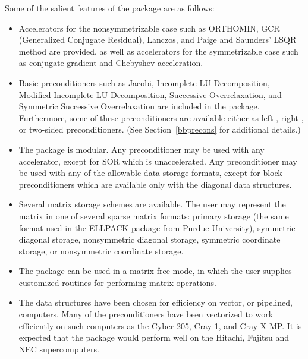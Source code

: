    Some of the salient features of the package are as follows:
\begin{itemize}
\item
 Accelerators for the nonsymmetrizable case such as ORTHOMIN, 
 GCR (Generalized Conjugate Residual), Lanczos, and Paige
 and Saunders' LSQR method are provided, as well as accelerators
 for the symmetrizable case such as conjugate gradient and 
 Chebyshev acceleration.
 
\item
 Basic preconditioners such as Jacobi, Incomplete LU 
 Decomposition, Modified Incomplete LU Decomposition, 
 Successive Overrelaxation, and Symmetric Successive 
 Overrelaxation are included in the package.  Furthermore, 
 some of these preconditioners are available either as 
 left-, right-, or two-sided preconditioners.  (See
 Section~\ref{bbprecons} for additional details.)
 
\item
 The package is modular.  Any preconditioner may be used with
 any accelerator, except for SOR which is unaccelerated.  Any
 preconditioner may be used with any of the allowable data
 storage formats, except for block preconditioners which are
 available only with the diagonal data structures.
 
\item
 Several matrix storage schemes are available.  The user may
 represent the matrix in one of several sparse matrix formats:
 primary storage (the same format used in the ELLPACK package
 \cite{ELLPACK} from Purdue University),
 symmetric diagonal storage, nonsymmetric diagonal storage,
 symmetric coordinate storage, or nonsymmetric coordinate
 storage.
 
\item
 The package can be used in a matrix-free mode, in which the user
 supplies customized routines for performing matrix operations.
 
\item
 The data structures have been chosen for efficiency on vector,
 or pipelined, computers.  Many of the preconditioners have been
 vectorized to work efficiently on such computers as the
 Cyber 205, Cray 1, and Cray X-MP.  It is expected that the
 package would perform well on the Hitachi, Fujitsu and NEC 
 supercomputers.
\end{itemize}

